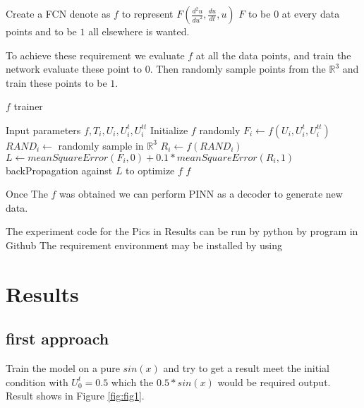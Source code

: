 \documentclass{article}
\begin{document}
Create a FCN denote as $f$ to represent
$F(\frac{d^2u}{{du}^2},\frac{du}{dt},u)$
$F$ to be $0$ at every data points and to be $1$ all elsewhere is wanted.

To achieve these requirement we evaluate $f$ at all the data points,
and train the network evaluate these point to $0$. Then randomly sample
points from the $\mathbb{R}^{3}$ and train these points to be $1$.


\begin{algorithm}
    \caption{$f$ trainer}
    \begin{algorithmic}[1]
        \REQUIRE Input parameters $f,T_i, U_i, U^{t}_{i}, U^{tt}_{i}$
        \STATE Initialize $f$ randomly
        \REPEAT
        \STATE $F_i \leftarrow f(U_i,U^{t}_{i},U^{tt}_{i})$
        \STATE $RAND_i \leftarrow$ randomly sample in $\mathbb{R}^{3}$
        \STATE $R_i \leftarrow f(RAND_i)$
        \STATE $L \leftarrow meanSquareError(F_i,0)+0.1*meanSquareError(R_i,1)$
        \STATE backPropagation against $L$ to optimize $f$
        \RETURN $f$
    \end{algorithmic}
\end{algorithm}

Once The $f$ was obtained we can perform PINN as a decoder
to generate new data.


The experiment code for the Pics in Results can
be run by python by program in Github\cite[deSineTasks]{firstApproachGithubProject}
The requirement environment may be installed by using\cite[reqs]{Envreqs}

\section{Results}
\subsection{first approach}
Train the model on a pure $sin(x)$ and try to
get a result meet the initial condition with
$U^{t}_0=0.5$ which the $0.5*sin(x)$ would be
required output. Result shows in Figure \ref{fig:fig1}.
\end{document}
